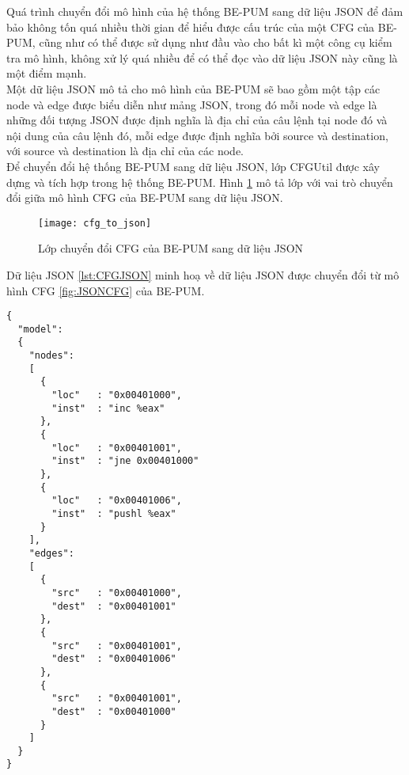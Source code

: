 \hspace{0.5cm}Quá trình chuyển đổi mô hình của hệ thống BE-PUM sang dữ liệu JSON để đảm bảo không tốn quá nhiều thời gian để hiểu được cấu trúc của một CFG của BE-PUM, cũng như có thể được sử dụng như đầu vào cho bất kì một công cụ kiểm tra mô hình, không xử lý quá nhiều để có thể đọc vào dữ liệu JSON này cũng là một điểm mạnh.\\

\hspace{0.5cm}Một dữ liệu JSON mô tả cho mô hình của BE-PUM sẽ bao gồm một tập các node và edge được biểu diễn như mảng JSON, trong đó mỗi node và edge là những đối tượng JSON được định nghĩa là địa chỉ của câu lệnh tại node đó và nội dung của câu lệnh đó, mỗi edge được định nghĩa bởi source và destination, với source và destination là địa chỉ của các node.\\

\hspace{0.5cm}Để chuyển đổi hệ thống BE-PUM sang dữ liệu JSON, lớp CFGUtil được xây dựng và tích hợp trong hệ thống BE-PUM. Hình \ref {fig:CFGUtilArchi} mô tả lớp với vai trò chuyển đổi giữa mô hình CFG của BE-PUM sang dữ liệu JSON.

\begin{figure}
\centering
\texttt{[image: cfg\_to\_json]}
\caption{Lớp chuyển đổi CFG của BE-PUM sang dữ liệu JSON}
\label{fig:CFGUtilArchi}
\end{figure}

\hspace{0.5cm}Dữ liệu JSON \ref {lst:CFGJSON} minh hoạ về dữ liệu JSON được chuyển đổi từ mô hình CFG \ref {fig:JSONCFG} của BE-PUM.

\begin{code}
\begin{lstlisting}[captionpos=b,caption={Dữ liệu JSON được chuyển đổi từ CFG của BE-PUM},label={lst:CFGJSON},frame=single]
{
  "model":
  {
    "nodes":
    [
      {
        "loc"	: "0x00401000",
        "inst"	: "inc %eax"
      },
      {
        "loc"	: "0x00401001",
        "inst"	: "jne 0x00401000"
      },
      {
        "loc"	: "0x00401006",
        "inst"	: "pushl %eax"
      }
    ],
    "edges":
    [
      {
        "src"	: "0x00401000",
        "dest"	: "0x00401001"
      },
	  {
        "src"	: "0x00401001",
        "dest"	: "0x00401006"
      },
      {
        "src"	: "0x00401001",
        "dest"	: "0x00401000"
      }
    ]
  }
}

\end{lstlisting}
\end{code}

